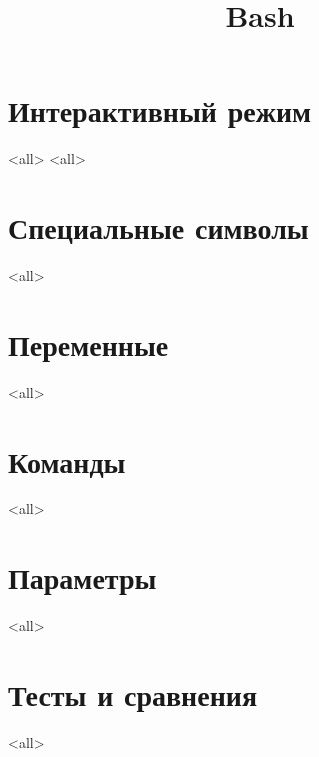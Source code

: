 


\title{Bash}



\begin{frame}
  \frametitle{}
  \titlepage
\end{frame}

\section{Интерактивный режим}
\mode<all>{}
\mode<all>{}
\section[symbols]{Специальные символы}
\mode<all>{}
\section[variables]{Переменные}
\mode<all>{}
\section[Commands]{Команды}
\mode<all>{}
\section{Параметры}
\mode<all>{}
\section{Тесты и сравнения}
\mode<all>{}



